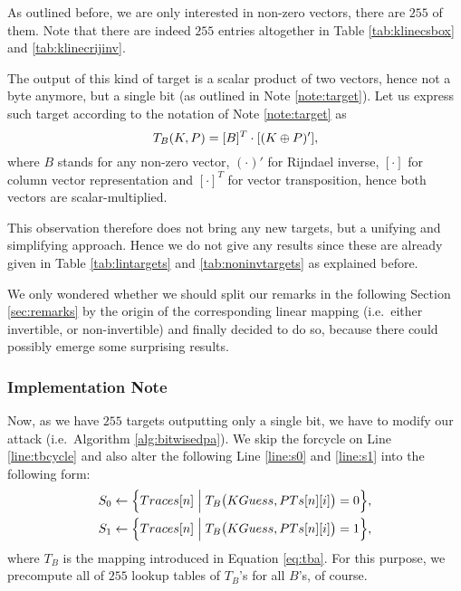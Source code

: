 As outlined before, we are only interested in non-zero vectors, there are $255$ of them. Note that there are indeed $255$ entries altogether in Table \ref{tab:klinecsbox} and \ref{tab:klinecrijinv}.

The output of this kind of target is a scalar product of two vectors, hence not a byte anymore, but a single bit (as outlined in Note \ref{note:target}). Let us express such target according to the notation of Note \ref{note:target} as
\begin{equation}
\label{eq:tba}
	T_B(K,P) = [B]^T\cdot [(K\oplus P)'] ,
\end{equation}
where $B$ stands for any non-zero vector, $(\cdot)'$ for Rijndael inverse, $[\cdot]$ for column vector representation and $[\cdot]^T$ for vector transposition, hence both vectors are scalar-multiplied.

This observation therefore does not bring any new targets, but a unifying and simplifying approach. Hence we do not give any results since these are already given in Table \ref{tab:lintargets} and \ref{tab:noninvtargets} as explained before.

We only wondered whether we should split our remarks in the following Section \ref{sec:remarks} by the origin of the corresponding linear mapping (i.e.\ either invertible, or non-invertible) and finally decided to do so, because there could possibly emerge some surprising results.

\subsubsection{Implementation Note}
	
	Now, as we have $255$ targets outputting only a single bit, we have to modify our attack (i.e.\ Algorithm \ref{alg:bitwisedpa}). We skip the forcycle on Line \ref{line:tbcycle} and also alter the following Line \ref{line:s0} and \ref{line:s1} into the following form:
	\begin{align*}
		S_0 &\gets \Bigl\{ Traces[n] \Bigm| T_B\bigl(KGuess, PTs[n][i]\bigr) = 0 \Bigr\} , \\
		S_1 &\gets \Bigl\{ Traces[n] \Bigm| T_B\bigl(KGuess, PTs[n][i]\bigr) = 1 \Bigr\} ,
	\end{align*}
	where $T_B$ is the mapping introduced in Equation \ref{eq:tba}. For this purpose, we precompute all of $255$ lookup tables of $T_B$'s for all $B$'s, of course.
	
